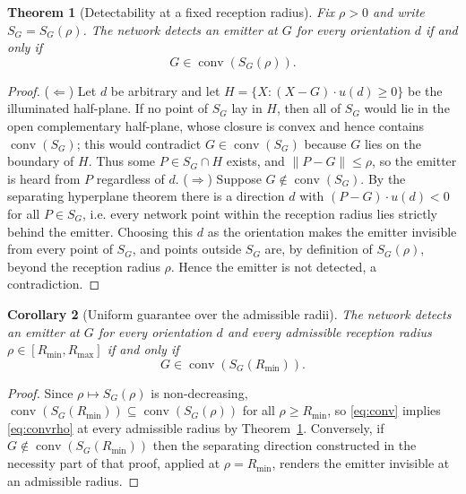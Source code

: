 \documentclass[journal,10pt]{IEEEtran}
\newtheorem{theorem}{Theorem}
\newtheorem{corollary}[theorem]{Corollary}
\theoremstyle{definition}
\newcommand{\conv}{\operatorname{conv}}
\newcommand{\Rmin}{R_{\min}}
\newcommand{\Rmax}{R_{\max}}
\begin{document}
\begin{theorem}[Detectability at a fixed reception radius]
\label{thm:detect}
Fix $\rho>0$ and write $S_G=S_G(\rho)$. The network detects an emitter at $G$ for \emph{every}
orientation $d$ if and only if
\begin{equation}
G\in\conv(S_G(\rho)).
\label{eq:convrho}
\end{equation}
\end{theorem}
\begin{proof}
($\Leftarrow$) Let $d$ be arbitrary and let $H=\{X:(X-G)\cdot u(d)\ge0\}$ be the illuminated
half-plane. If no point of $S_G$ lay in $H$, then all of $S_G$ would lie in the open complementary
half-plane, whose closure is convex and hence contains $\conv(S_G)$; this would contradict
$G\in\conv(S_G)$ because $G$ lies on the boundary of $H$. Thus some $P\in S_G\cap H$ exists, and
$\|P-G\|\le\rho$, so the emitter is heard from $P$ regardless of $d$.
($\Rightarrow$) Suppose $G\notin\conv(S_G)$. By the separating hyperplane theorem there is a
direction $d$ with $(P-G)\cdot u(d)<0$ for all $P\in S_G$, i.e. every network point within the
reception radius lies strictly behind the emitter. Choosing this $d$ as the orientation makes the
emitter invisible from every point of $S_G$, and points outside $S_G$ are, by definition of
$S_G(\rho)$, beyond the reception radius $\rho$. Hence the emitter is not detected, a
contradiction.
\end{proof}

\begin{corollary}[Uniform guarantee over the admissible radii]
\label{cor:uniform}
The network detects an emitter at $G$ for every orientation $d$ \emph{and every} admissible
reception radius $\rho\in[\Rmin,\Rmax]$ if and only if
\begin{equation}
G\in\conv(S_G(\Rmin)).
\label{eq:conv}
\end{equation}
\end{corollary}
\begin{proof}
Since $\rho\mapsto S_G(\rho)$ is non-decreasing, $\conv(S_G(\Rmin))\subseteq\conv(S_G(\rho))$ for
all $\rho\ge\Rmin$, so \eqref{eq:conv} implies \eqref{eq:convrho} at every admissible radius by
Theorem~\ref{thm:detect}. Conversely, if $G\notin\conv(S_G(\Rmin))$ then the separating direction
constructed in the necessity part of that proof, applied at $\rho=\Rmin$, renders the emitter
invisible at an admissible radius.
\end{proof}
\end{document}

